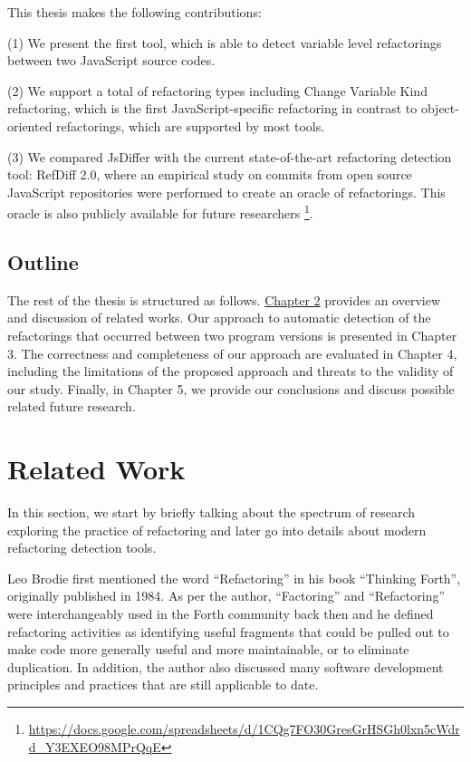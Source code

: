 \documentclass[letterpaper,12pt,onecolumn,final]{report}
\begin{document}
This thesis makes the following contributions:

(1) We present the first tool, which is able to detect variable level refactorings between two JavaScript source codes.

(2) We support a total of \supportedRefTypesJsDiffer{} refactoring types including Change Variable Kind refactoring, which is the first JavaScript-specific refactoring in contrast to object-oriented refactorings, which are supported by most tools.

(3) We compared JsDiffer with the current state-of-the-art refactoring detection tool: RefDiff 2.0, where an empirical study on \evTotalCommits{} commits from \evTotalProjectCounts{} open source JavaScript repositories were performed to create an oracle of \oracleValidatedInstances{} refactorings. This oracle is also publicly available for future researchers \footnote{\url{https://docs.google.com/spreadsheets/d/1CQg7FO30GresGrHSGh0lxn5cWdrd_Y3EXEO98MPrQqE}}.


\section{Outline}
\label{sec:outline}
The rest of the thesis is structured as follows. \hyperref[chap:relatedWork]{Chapter 2}  provides an overview and discussion of related works. Our approach to automatic detection of the refactorings that occurred between two program versions is presented in Chapter 3. The correctness and completeness of our approach are evaluated in Chapter 4, including the limitations of the proposed approach and threats to the validity of our study. Finally, in Chapter 5, we provide our conclusions and discuss possible related future research.


\chapter{Related Work}
\label{chap:relatedwork}

In this section, we start by briefly talking about the spectrum of research exploring the practice of refactoring and later go into details about modern refactoring detection tools.

Leo Brodie \cite{thinkingforth} first mentioned the word “Refactoring” in his book “Thinking Forth”, originally published in 1984. As per the author, “Factoring” and “Refactoring” were interchangeably used in the Forth community back then and he defined refactoring activities as identifying useful fragments that could be pulled out to make code more generally useful and more maintainable, or to eliminate duplication. In addition, the author also discussed many software development principles and practices that are still applicable to date.
\end{document}
